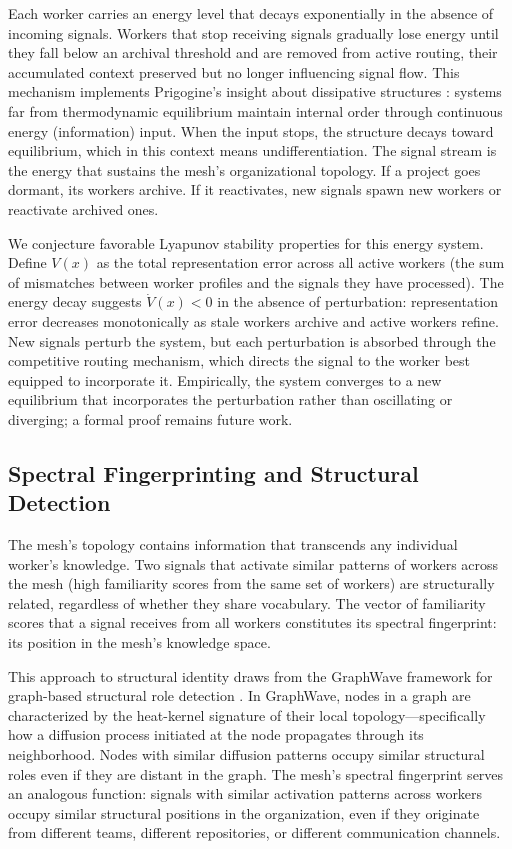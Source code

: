 \documentclass[11pt,a4paper]{article}
\begin{document}
Each worker carries an energy level that decays exponentially in the absence of incoming signals. Workers that stop receiving signals gradually lose energy until they fall below an archival threshold and are removed from active routing, their accumulated context preserved but no longer influencing signal flow. This mechanism implements Prigogine's insight about dissipative structures \citep{prigogine1977}: systems far from thermodynamic equilibrium maintain internal order through continuous energy (information) input. When the input stops, the structure decays toward equilibrium, which in this context means undifferentiation. The signal stream is the energy that sustains the mesh's organizational topology. If a project goes dormant, its workers archive. If it reactivates, new signals spawn new workers or reactivate archived ones.

We conjecture favorable Lyapunov stability properties for this energy system. Define $V(x)$ as the total representation error across all active workers (the sum of mismatches between worker profiles and the signals they have processed). The energy decay suggests $\dot{V}(x) < 0$ in the absence of perturbation: representation error decreases monotonically as stale workers archive and active workers refine. New signals perturb the system, but each perturbation is absorbed through the competitive routing mechanism, which directs the signal to the worker best equipped to incorporate it. Empirically, the system converges to a new equilibrium that incorporates the perturbation rather than oscillating or diverging; a formal proof remains future work.


\subsection{Spectral Fingerprinting and Structural Detection}
\label{sec:spectral}

The mesh's topology contains information that transcends any individual worker's knowledge. Two signals that activate similar patterns of workers across the mesh (high familiarity scores from the same set of workers) are structurally related, regardless of whether they share vocabulary. The vector of familiarity scores that a signal receives from all workers constitutes its spectral fingerprint: its position in the mesh's knowledge space.

This approach to structural identity draws from the GraphWave framework for graph-based structural role detection \citep{donnat2018}. In GraphWave, nodes in a graph are characterized by the heat-kernel signature of their local topology---specifically how a diffusion process initiated at the node propagates through its neighborhood. Nodes with similar diffusion patterns occupy similar structural roles even if they are distant in the graph. The mesh's spectral fingerprint serves an analogous function: signals with similar activation patterns across workers occupy similar structural positions in the organization, even if they originate from different teams, different repositories, or different communication channels.
\end{document}
